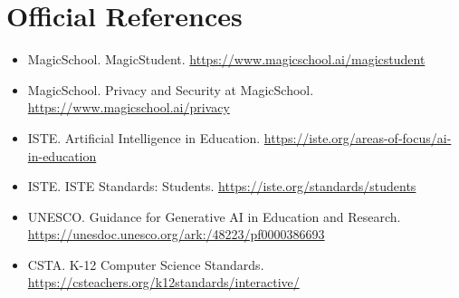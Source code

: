 \documentclass[11pt]{article}
\begin{document}
\section*{Official References}
\begin{itemize}
\item MagicSchool. MagicStudent. \url{https://www.magicschool.ai/magicstudent}
\item MagicSchool. Privacy and Security at MagicSchool. \url{https://www.magicschool.ai/privacy}
\item ISTE. Artificial Intelligence in Education. \url{https://iste.org/areas-of-focus/ai-in-education}
\item ISTE. ISTE Standards: Students. \url{https://iste.org/standards/students}
\item UNESCO. Guidance for Generative AI in Education and Research. \url{https://unesdoc.unesco.org/ark:/48223/pf0000386693}
\item CSTA. K-12 Computer Science Standards. \url{https://csteachers.org/k12standards/interactive/}
\end{itemize}
\end{document}
